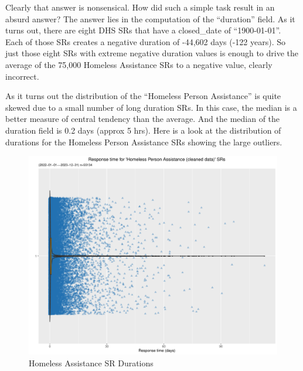 \documentclass[12pt, titlepage]{article}
\begin{document}
	Clearly that answer is nonsensical. How did such a simple task result 
	in an absurd answer? The answer lies in the computation of the ``duration'' 
	field. As it turns out, there are eight DHS SRs that have a closed\_date 
	of ``1900-01-01''. Each of those SRs creates a negative duration of -44,602 
	days (-122 years). So just those eight SRs with extreme negative duration 
	values is enough to drive the average of the 75,000 
	Homeless Assistance SRs to a negative value, clearly incorrect.
		
	As it turns out the distribution of the ``Homeless Person Assistance'' is 
	quite skewed due to a small number of long duration SRs. In this case, 
	the median is a better measure of central tendency than the average. 
	And the median of the duration field is  0.2 days (approx 5 hrs). 
	Here is a look at the distribution of durations for the Homeless Person 
	Assistance SRs showing 	the large outliers. 
		
	\begin{figure}[tbp]
	 	 \centering
	 	 \includegraphics[width = \textwidth]{homeless_response_time_clean.pdf}
		 \caption{Homeless Assistance SR Durations}
		 \label{fig:homeless}
	\end{figure}
		
\end{document}
